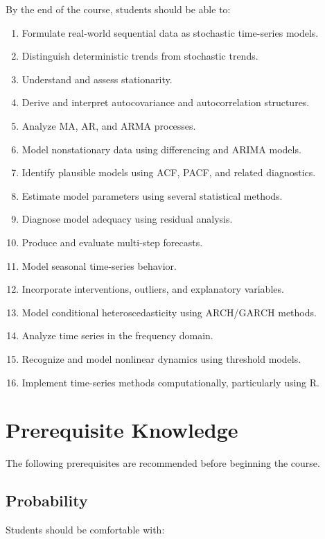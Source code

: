 \documentclass[11pt,a4paper]{article}
\begin{document}
By the end of the course, students should be able to:

\begin{enumerate}
    \item Formulate real-world sequential data as stochastic time-series
          models.
    \item Distinguish deterministic trends from stochastic trends.
    \item Understand and assess stationarity.
    \item Derive and interpret autocovariance and autocorrelation structures.
    \item Analyze MA, AR, and ARMA processes.
    \item Model nonstationary data using differencing and ARIMA models.
    \item Identify plausible models using ACF, PACF, and related diagnostics.
    \item Estimate model parameters using several statistical methods.
    \item Diagnose model adequacy using residual analysis.
    \item Produce and evaluate multi-step forecasts.
    \item Model seasonal time-series behavior.
    \item Incorporate interventions, outliers, and explanatory variables.
    \item Model conditional heteroscedasticity using ARCH/GARCH methods.
    \item Analyze time series in the frequency domain.
    \item Recognize and model nonlinear dynamics using threshold models.
    \item Implement time-series methods computationally, particularly using R.
\end{enumerate}

\section{Prerequisite Knowledge}

The following prerequisites are recommended before beginning the course.

\subsection{Probability}

Students should be comfortable with:
\end{document}
